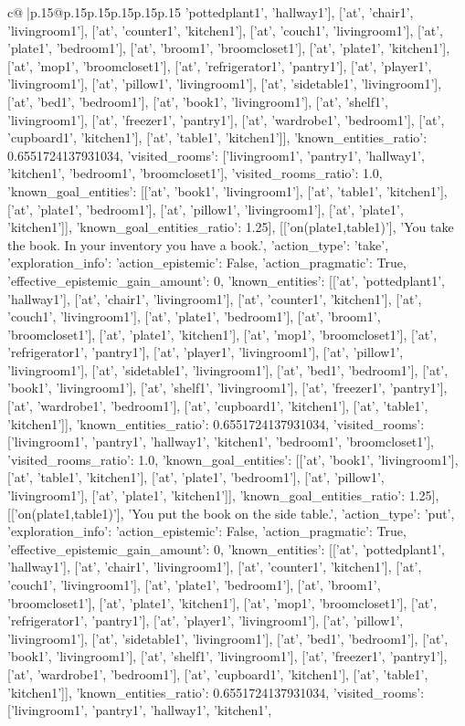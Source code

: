 \documentclass{article}
\begin{document}
{\begin{supertabular}{c@{$\;$}|p{.15\linewidth}@{}p{.15\linewidth}p{.15\linewidth}p{.15\linewidth}p{.15\linewidth}p{.15\linewidth}}
{{{'pottedplant1', 'hallway1'], ['at', 'chair1', 'livingroom1'], ['at', 'counter1', 'kitchen1'], ['at', 'couch1', 'livingroom1'], ['at', 'plate1', 'bedroom1'], ['at', 'broom1', 'broomcloset1'], ['at', 'plate1', 'kitchen1'], ['at', 'mop1', 'broomcloset1'], ['at', 'refrigerator1', 'pantry1'], ['at', 'player1', 'livingroom1'], ['at', 'pillow1', 'livingroom1'], ['at', 'sidetable1', 'livingroom1'], ['at', 'bed1', 'bedroom1'], ['at', 'book1', 'livingroom1'], ['at', 'shelf1', 'livingroom1'], ['at', 'freezer1', 'pantry1'], ['at', 'wardrobe1', 'bedroom1'], ['at', 'cupboard1', 'kitchen1'], ['at', 'table1', 'kitchen1']], 'known_entities_ratio': 0.6551724137931034, 'visited_rooms': ['livingroom1', 'pantry1', 'hallway1', 'kitchen1', 'bedroom1', 'broomcloset1'], 'visited_rooms_ratio': 1.0, 'known_goal_entities': [['at', 'book1', 'livingroom1'], ['at', 'table1', 'kitchen1'], ['at', 'plate1', 'bedroom1'], ['at', 'pillow1', 'livingroom1'], ['at', 'plate1', 'kitchen1']], 'known_goal_entities_ratio': 1.25}}], [['on(plate1,table1)'], 'You take the book. In your inventory you have a book.', {'action_type': 'take', 'exploration_info': {'action_epistemic': False, 'action_pragmatic': True, 'effective_epistemic_gain_amount': 0, 'known_entities': [['at', 'pottedplant1', 'hallway1'], ['at', 'chair1', 'livingroom1'], ['at', 'counter1', 'kitchen1'], ['at', 'couch1', 'livingroom1'], ['at', 'plate1', 'bedroom1'], ['at', 'broom1', 'broomcloset1'], ['at', 'plate1', 'kitchen1'], ['at', 'mop1', 'broomcloset1'], ['at', 'refrigerator1', 'pantry1'], ['at', 'player1', 'livingroom1'], ['at', 'pillow1', 'livingroom1'], ['at', 'sidetable1', 'livingroom1'], ['at', 'bed1', 'bedroom1'], ['at', 'book1', 'livingroom1'], ['at', 'shelf1', 'livingroom1'], ['at', 'freezer1', 'pantry1'], ['at', 'wardrobe1', 'bedroom1'], ['at', 'cupboard1', 'kitchen1'], ['at', 'table1', 'kitchen1']], 'known_entities_ratio': 0.6551724137931034, 'visited_rooms': ['livingroom1', 'pantry1', 'hallway1', 'kitchen1', 'bedroom1', 'broomcloset1'], 'visited_rooms_ratio': 1.0, 'known_goal_entities': [['at', 'book1', 'livingroom1'], ['at', 'table1', 'kitchen1'], ['at', 'plate1', 'bedroom1'], ['at', 'pillow1', 'livingroom1'], ['at', 'plate1', 'kitchen1']], 'known_goal_entities_ratio': 1.25}}], [['on(plate1,table1)'], 'You put the book on the side table.', {'action_type': 'put', 'exploration_info': {'action_epistemic': False, 'action_pragmatic': True, 'effective_epistemic_gain_amount': 0, 'known_entities': [['at', 'pottedplant1', 'hallway1'], ['at', 'chair1', 'livingroom1'], ['at', 'counter1', 'kitchen1'], ['at', 'couch1', 'livingroom1'], ['at', 'plate1', 'bedroom1'], ['at', 'broom1', 'broomcloset1'], ['at', 'plate1', 'kitchen1'], ['at', 'mop1', 'broomcloset1'], ['at', 'refrigerator1', 'pantry1'], ['at', 'player1', 'livingroom1'], ['at', 'pillow1', 'livingroom1'], ['at', 'sidetable1', 'livingroom1'], ['at', 'bed1', 'bedroom1'], ['at', 'book1', 'livingroom1'], ['at', 'shelf1', 'livingroom1'], ['at', 'freezer1', 'pantry1'], ['at', 'wardrobe1', 'bedroom1'], ['at', 'cupboard1', 'kitchen1'], ['at', 'table1', 'kitchen1']], 'known_entities_ratio': 0.6551724137931034, 'visited_rooms': ['livingroom1', 'pantry1', 'hallway1', 'kitchen1', }}}
\end{supertabular}}
\end{document}
